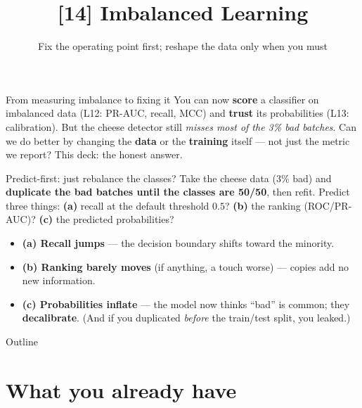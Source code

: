 \documentclass[aspectratio=169]{beamer}
\title{[14] Imbalanced Learning}
\subtitle{Fix the operating point first; reshape the data only when you must}
\date{}
\begin{document}
\begin{frame}{From measuring imbalance to fixing it}
  You can now \textbf{score} a classifier on imbalanced data (L12: PR-AUC, recall, MCC) and
  \textbf{trust} its probabilities (L13: calibration). But the cheese detector still \emph{misses
  most of the 3\% bad batches}.
  \vfill
  Can we do better by changing the \textbf{data} or the \textbf{training} itself --- not just the
  metric we report? This deck: the honest answer.
  \vfill
\end{frame}

\begin{frame}{Predict-first: just rebalance the classes?}
  Take the cheese data ($3\%$ bad) and \textbf{duplicate the bad batches until the classes are
  50/50}, then refit. Predict three things:
  \vfill
  \textbf{(a)} recall at the default threshold $0.5$? \quad \textbf{(b)} the ranking (ROC/PR-AUC)?
  \quad \textbf{(c)} the predicted probabilities?
  \vfill
  \begin{itemize}\small
    \item \textbf{(a) Recall jumps} --- the decision boundary shifts toward the minority.
    \item \textbf{(b) Ranking barely moves} (if anything, a touch worse) --- copies add no new information.
    \item \textbf{(c) Probabilities inflate} --- the model now thinks ``bad'' is common; they
      \textbf{decalibrate}. (And if you duplicated \emph{before} the train/test split, you leaked.)
  \end{itemize}
  \vfill
\end{frame}

\begin{frame}{Outline}
  \tableofcontents
\end{frame}

\section{What you already have}
\end{document}

